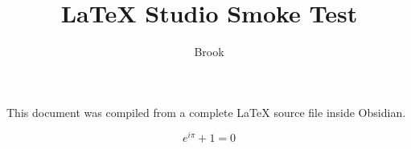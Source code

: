 \documentclass{article}
\title{LaTeX Studio Smoke Test}
\author{Brook}
\begin{document}
\maketitle

This document was compiled from a complete \LaTeX{} source file inside Obsidian.

\begin{equation}
  e^{i\pi} + 1 = 0
\end{equation}
\end{document}
